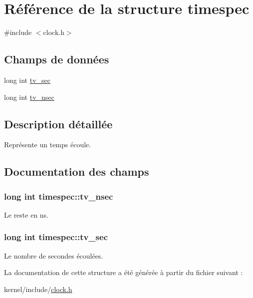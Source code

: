 \hypertarget{structtimespec}{\section{\-Référence de la structure timespec}
\label{structtimespec}
}


{\ttfamily \#include $<$clock.\-h$>$}

\subsection*{\-Champs de données}
\begin{DoxyCompactItemize}
\item 
long int \hyperlink{structtimespec_af632894a12c37dea87073c0126f99fff}{tv\-\_\-sec}
\item 
long int \hyperlink{structtimespec_aa9689622a344d847333e534ac23d3093}{tv\-\_\-nsec}
\end{DoxyCompactItemize}


\subsection{\-Description détaillée}
\-Représente un temps écoule. 

\subsection{\-Documentation des champs}
\hypertarget{structtimespec_aa9689622a344d847333e534ac23d3093}{
\subsubsection[{tv\-\_\-nsec}]{\setlength{\rightskip}{0pt plus 5cm}long int {\bf timespec\-::tv\-\_\-nsec}}}\label{structtimespec_aa9689622a344d847333e534ac23d3093}
\-Le reste en ns. \hypertarget{structtimespec_af632894a12c37dea87073c0126f99fff}{
\subsubsection[{tv\-\_\-sec}]{\setlength{\rightskip}{0pt plus 5cm}long int {\bf timespec\-::tv\-\_\-sec}}}\label{structtimespec_af632894a12c37dea87073c0126f99fff}
\-Le nombre de secondes écoulées. 

\-La documentation de cette structure a été générée à partir du fichier suivant \-:\begin{DoxyCompactItemize}
\item 
kernel/include/\hyperlink{clock_8h}{clock.\-h}\end{DoxyCompactItemize}
